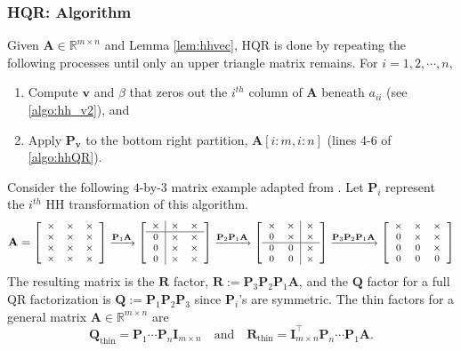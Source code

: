 \documentclass[review,onefignum,onetabnum]{siamart190516}
\newcommand{\R}{\mathbb{R}}
\newcommand{\bb}[1]{\mathbf{#1}}
\begin{document}
\subsubsection{HQR: Algorithm}
Given $\bb{A}\in\R^{m\times n}$ and Lemma \ref{lem:hhvec}, HQR is done by repeating the following processes until only an upper triangle matrix remains.
For $i = 1, 2, \cdots, n,$
\begin{enumerate}[Step 1)]
	\item Compute $\bb{v}$ and $\beta$ that zeros out the $i^{th}$ column of $\bb{A}$ beneath $a_{ii}$ (see \cref{algo:hh_v2}), and
	\item Apply $\bb{P}_{\bb{v}}$ to the bottom right partition, $\bb{A}[i:m, i:n]$ (lines 4-6 of \cref{algo:hhQR}).
\end{enumerate}

Consider the following $4$-by-$3$ matrix example adapted from \cite{Higham2002}. 
Let $\bb{P}_{i}$ represent the $i^{th}$ HH transformation of this algorithm. 
\[\footnotesize\bb{A} = \left[ \begin{array}{ccc}
\times & \times & \times \\
\times & \times & \times \\
\times & \times & \times \\
\times & \times & \times
\end{array}
\right]\xrightarrow{\bb{P}_{1}\bb{A}}\left[ \begin{array}{c|cc}
\times & \times & \times \\ \hline
0 & \times & \times \\
0 & \times & \times \\
0 & \times & \times
\end{array}
\right]
\xrightarrow{\bb{P}_{2}\bb{P}_{1}\bb{A}}\left[
\begin{array}{cc|c}
\times & \times & \times \\
0 & \times & \times \\ \hline
0 & 0 & \times \\
0 & 0 & \times 
\end{array} \right]
\xrightarrow{\bb{P}_{3}\bb{P}_{2}\bb{P}_{1}\bb{A}} \left[ \begin{array}{ccc}
\times & \times & \times \\
0 & \times & \times \\
0 & 0 & \times \\
0 & 0 & 0 
\end{array}\right]\]
The resulting matrix is the $\bb{R}$ factor, $\bb{R}:= \bb{P}_{3}\bb{P}_{2}\bb{P}_{1}\bb{A}$, and the $\bb{Q}$ factor for a full QR factorization is $\bb{Q}:=\bb{P}_{1}\bb{P}_{2}\bb{P}_{3}$ since $\bb{P}_{i}$'s are symmetric.
The thin factors for a general matrix $\bb{A}\in\R^{m\times n}$ are
\begin{equation}
\bb{Q}_{\text{thin}} = \bb{P}_{1} \cdots \bb{P}_{n}\bb{I}_{m\times n}\quad \text{and} \quad \bb{R}_{\text{thin}} = \bb{I}_{m\times n}^{\top}\bb{P}_{n}\cdots \bb{P}_{1}\bb{A}.
\end{equation}
\end{document}
